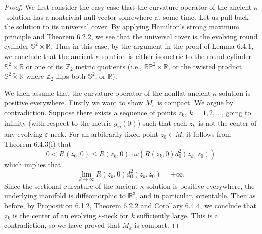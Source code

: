 \begin{proof}
We first consider the easy case that the curvature operator of the
ancient $\kappa$-solution has a nontrivial null vector somewhere
at some time. Let us pull back the solution to its universal
cover. By applying Hamilton's strong maximum principle and Theorem
6.2.2, we see that the universal cover is the evolving round
cylinder $\mathbb{S}^2 \times \mathbb{R}$. Thus in this case, by
the argument in the proof of Lemma 6.4.1, we conclude that the
ancient $\kappa$-solution is either isometric to the round
cylinder $\mathbb{S}^2 \times \mathbb{R}$ or one of its
$\mathbb{Z}_2$ metric quotients (i.e., $\mathbb{R}\mathbb{P}^2
\times \mathbb{R}$, or the twisted product $\mathbb{S}^2
\tilde{\times} \mathbb{R}$ where $\mathbb{Z}_2$ flips both
$\mathbb{S}^2$, or $\mathbb{R}$).

We then assume that the curvature operator of the nonflat ancient
$\kappa$-solution is positive everywhere. Firstly we want to show
$M_\varepsilon$ is compact. We argue by contradiction. Suppose
there exists a sequence of points $z_k,\ k=1,2,\ldots$, going to
infinity (with respect to the metric $g_{ij}(0)$) such that each
$z_k$ is not the center of any evolving $\varepsilon$-neck. For an
arbitrarily fixed point $z_0\in M$, it follows from Theorem
6.4.3(i) that
$$
0<R(z_0,0)\leq R(z_k,0)\cdot \omega(R(z_k,0)d^2_0(z_k,z_0))
$$
which implies that
$$
\lim_{k\rightarrow\infty}R(z_k,0)d^2_0(z_k,z_0)=+\infty.
$$
Since the sectional curvature of the ancient $\kappa$-solution is
positive everywhere, the underlying manifold is diffeomorphic to
$\mathbb{R}^3$, and in particular, orientable. Then as before, by
Proposition 6.1.2, Theorem 6.2.2 and Corollary 6.4.4, we conclude
that $z_k$ is the center of an evolving $\varepsilon$-neck for $k$
sufficiently large. This is a contradiction, so we have proved
that $M_{\varepsilon}$ is compact.


\end{proof}
